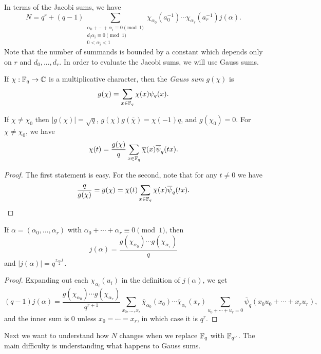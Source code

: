 In terms of the Jacobi sums, we have
\[
N = q^r + (q-1)\sum_{\substack{\alpha_0+\cdots+\alpha_i \equiv 0\pmod{1}\\d_i\alpha_i\equiv 0 \pmod{1}\\0 < \alpha_i < 1}} \chi_{\alpha_0}(a_0^{-1})\cdots\chi_{\alpha_r}(a_r^{-1})j(\alpha).
\]
Note that the number of summands is bounded by a constant which depends only on $r$ and $d_0, ..., d_r$. In order to evaluate the Jacobi sums, we will use Gauss sums.

\begin{defn} If $\chi:\mathbb{F}_q\rightarrow \mathbb{C}$ is a multiplicative character, then the \emph{Gauss sum} $g(\chi)$ is
\[
g(\chi) = \sum_{x\in\mathbb{F}_q} \chi(x)\psi_q(x).
\]
\end{defn}

\begin{prop} If $\chi \ne \chi_0$ then $|g(\chi)| = \sqrt{q}$, $g(\chi)g(\overline{\chi}) = \chi(-1)q$, and $g(\chi_0) = 0$. For $\chi \ne \chi_0$, we have
\[
\chi(t) = \frac{g(\chi)}{q}\sum_{x\in\mathbb{F}_q} \overline{\chi}(x)\overline{\psi}_q(tx).
\]
\end{prop}
\begin{proof} The first statement is easy. For the second, note that for any $t\ne 0$ we have
\[
\frac{q}{g(\chi)} = \overline{g}(\chi) = \overline{\chi}(t)\sum_{x\in\mathbb{F}_q} \overline{\chi}(x)\overline{\psi}_q(tx).\qedhere
\]
\end{proof}

\begin{prop} If $\alpha = (\alpha_0, ..., \alpha_r)$ with $\alpha_0 + \cdots + \alpha_r \equiv 0 \pmod{1}$, then
\[
j(\alpha) = \frac{g(\chi_{\alpha_0})\cdots g(\chi_{\alpha_r})}{q}
\]
and $|j(\alpha)| = q^{\frac{r-1}{2}}$.
\end{prop}
\begin{proof} Expanding out each $\chi_{\alpha_i}(u_i)$ in the definition of $j(\alpha)$, we get
\[
(q-1)j(\alpha) = \frac{g(\chi_{\alpha_0})\cdots g(\chi_{\alpha_r})}{q^{r+1}} \sum_{x_0, ..., x_r} \overline{\chi}_{\alpha_0}(x_0)\cdots \overline{\chi}_{\alpha_r}(x_r) \sum_{u_0+\cdots + u_r=0} \overline{\psi}_q(x_0u_0 + \cdots + x_ru_r),
\]
and the inner sum is $0$ unless $x_0 = \cdots = x_r$, in which case it is $q^r$.
\end{proof}

Next we want to understand how $N$ changes when we replace $\mathbb{F}_q$ with $\mathbb{F}_{q^\nu}$. The main difficulty is understanding what happens to Gauss sums.

